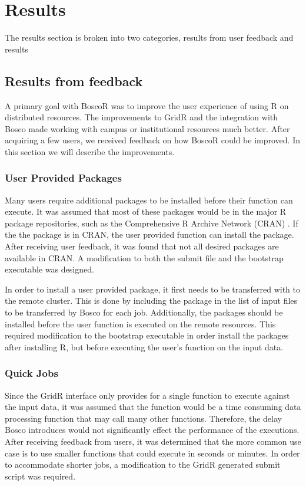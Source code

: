 \documentclass[conference]{IEEEtran}
\begin{document}
\section{Results}

The results section is broken into two categories, results from user feedback and results 

\subsection{Results from feedback}

A primary goal with BoscoR was to improve the user experience of using R on distributed resources.  The improvements to GridR and the integration with Bosco made working with campus or institutional resources much better. After acquiring a few users, we received feedback on how BoscoR could be improved.  In this section we will describe the improvements.

\subsubsection{User Provided Packages}

Many users require additional packages to be installed before their function can execute.  It was assumed that most of these packages would be in the major R package repositories, such as the Comprehensive R Archive Network (CRAN) \cite{cran}.  If the the package is in CRAN, the user provided function can install the package.  After receiving user feedback, it was found that not all desired packages are available in CRAN.  A modification to both the submit file and the bootstrap executable was designed.

In order to install a user provided package, it first needs to be transferred with to the remote cluster.  This is done by including the package in the list of input files to be transferred by Bosco for each job.  Additionally, the packages should be installed before the user function is executed on the remote resources.  This required modification to the bootstrap executable in order install the packages after installing R, but before executing the user's function on the input data.

\subsubsection{Quick Jobs}
Since the GridR interface only provides for a single function to execute against the input data, it was assumed that the function would be a time consuming data processing function that may call many other functions.  Therefore, the delay Bosco introduces would not significantly effect the performance of the executions.  After receiving feedback from users, it was determined that the more common use case is to use smaller functions that could execute in seconds or minutes.  In order to accommodate shorter jobs, a modification to the GridR generated submit script was required.
\end{document}
